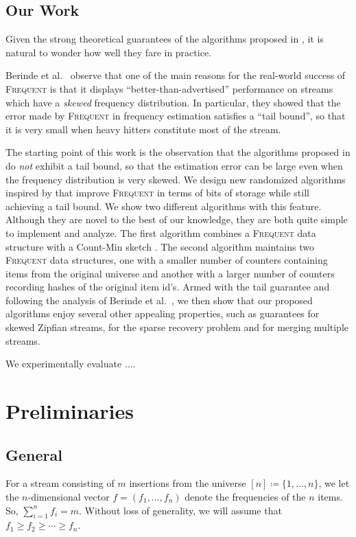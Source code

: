 \documentclass[sigconf,review=true,anonymous=true,screen]{acmart}
\begin{document}
\subsection{Our Work}
Given the strong theoretical guarantees of the algorithms proposed in \cite{BDW16}, it is natural to wonder how well they fare in practice. 

Berinde et al.~\cite{BCIS} observe that one of the main reasons for the real-world success of \textsc{Frequent} is that it displays ``better-than-advertised'' performance on streams which have a {\em skewed} frequency distribution. In particular, they showed that the error made by \textsc{Frequent} in frequency estimation satisfies a ``tail bound'', so that it is very small when heavy hitters constitute most of the stream.

The starting point of this work is the observation that the algorithms proposed in \cite{BDW16} do {\em not} exhibit a tail bound, so that the estimation error can be large even when the frequency distribution is very skewed. We design new randomized algorithms inspired by \cite{BDW16} that improve \textsc{Frequent} in terms of bits of storage while still achieving a tail bound. We show two different algorithms with this feature. Although they are novel to the best of our knowledge, they are both quite simple to implement and analyze. The first algorithm combines a \textsc{Frequent} data structure with a Count-Min sketch \cite{CM05}. The second algorithm maintains two \textsc{Frequent} data structures, one with a smaller number of counters containing items from the original universe and another with a larger number of counters recording hashes of the original item id's.
Armed with the tail guarantee and following the analysis of Berinde et al.~\cite{BCIS}, we then show that our proposed algorithms enjoy several other appealing properties, such as guarantees for skewed Zipfian streams, for the sparse recovery problem and for merging multiple streams.

We experimentally evaluate $\dots$.




    \section{Preliminaries}
    \subsection{General}
For a stream consisting of $m$ insertions from the universe $[n] \coloneqq \{1,\dots, n\}$, we let the $n$-dimensional vector $f = (f_1, \dots, f_n)$
denote the frequencies of the $n$ items. So, $\sum_{i=1}^n f_i = m$. Without loss of generality, we will assume that $f_1 \geq f_2 \geq \cdots \geq f_n$. 
\end{document}
